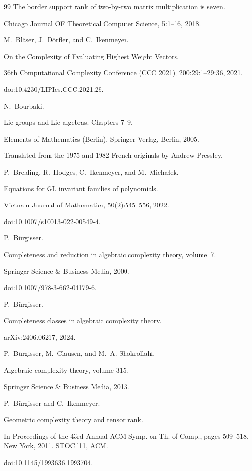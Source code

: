 \begin{thebibliography}{99}
The border support rank of two-by-two matrix multiplication is seven.


Chicago Journal OF Theoretical Computer Science, 5:1–16, 2018.

M. Bläser, J. Dörfler, and C. Ikenmeyer.


On the Complexity of Evaluating Highest Weight Vectors.


36th Computational Complexity Conference (CCC 2021),
200:29:1–29:36, 2021.


doi:10.4230/LIPIcs.CCC.2021.29.

N. Bourbaki.


Lie groups and Lie algebras. Chapters 7–9.


Elements of Mathematics (Berlin). Springer-Verlag, Berlin, 2005.


Translated from the 1975 and 1982 French originals by Andrew
Pressley.

P. Breiding, R. Hodges, C. Ikenmeyer, and M. Michałek.


Equations for GL invariant families of polynomials.


Vietnam Journal of Mathematics, 50(2):545–556, 2022.


doi:10.1007/s10013-022-00549-4.

P. Bürgisser.


Completeness and reduction in algebraic complexity theory,
volume 7.


Springer Science \& Business Media, 2000.


doi:10.1007/978-3-662-04179-6.

P. Bürgisser.


Completeness classes in algebraic complexity theory.


arXiv:2406.06217, 2024.

P. Bürgisser, M. Clausen, and M. A. Shokrollahi.


Algebraic complexity theory, volume 315.


Springer Science \& Business Media, 2013.

P. Bürgisser and C. Ikenmeyer.


Geometric complexity theory and tensor rank.


In Proceedings of the 43rd Annual ACM Symp. on Th. of Comp.,
pages 509–518, New York, 2011. STOC ’11, ACM.


doi:10.1145/1993636.1993704.


\end{thebibliography}
